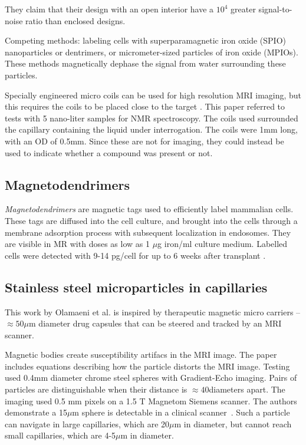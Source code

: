 \documentclass[letterpaper, 10 pt, conference]{ieeeconf}
\begin{document}
They claim that their design with an open interior have a $10^4$ greater signal-to-noise ratio than enclosed designs.

 
Competing methods:  labeling cells with superparamagnetic iron oxide (SPIO) nanoparticles or dentrimers\cite{bulte2001magnetodendrimers}, or micrometer-sized particles of iron oxide (MPIOs). These methods magnetically dephase the signal from water surrounding these particles.  
 
 
 Specially engineered micro coils can be used for high resolution MRI imaging, but this requires the coils to be placed close to the target \cite{olson1995high}.  This paper referred to tests with 5 nano-liter samples for NMR spectroscopy.  The coils used surrounded the capillary containing the liquid under interrogation. The coils were 1mm long, with an OD of 0.5mm. Since these are not for imaging, they could instead be used to indicate whether a compound was present or not.
 
 \subsection{Magnetodendrimers}

 \emph{Magnetodendrimers} are magnetic tags used to efficiently label mammalian cells. These tags are diffused into the cell culture, and brought into the cells through a
 membrane adsorption process with subsequent localization in endosomes.  They are visible in MR with doses as low as 1 $\mu$g iron/ml culture medium. Labelled cells were detected with 9-14 pg/cell for up to 6 weeks after transplant  \cite{bulte2001magnetodendrimers}. 
 

 
 
\subsection{Stainless steel microparticles in capillaries}
This work by Olamaeni et al. \cite{olamaei2011accurate} is inspired by therapeutic magnetic micro carriers -- $\approx 50\mu$m diameter drug capsules that can be steered and tracked by an MRI scanner. 

Magnetic bodies create susceptibility artifacs in the MRI image. The paper\cite{olamaei2011accurate}  includes equations describing how the particle distorts the MRI image.  Testing used 0.4mm diameter chrome steel spheres with Gradient-Echo imaging. Pairs of particles are distinguishable when their distance is $\approx40$diameters apart. The imaging used 0.5 mm pixels on a 1.5 T Magnetom Siemens scanner.  The authors demonstrate a 15$\mu$m sphere is detectable in a clinical scanner~\cite{olamaei2010mri}. Such a particle can navigate in large capillaries, which are 20$\mu$m in diameter, but cannot reach small capillaries, which are 4-5$\mu$m in diameter.
 
\end{document}
